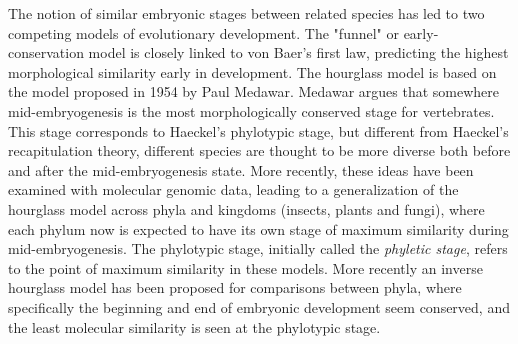 The notion of similar embryonic stages between related species has led to two competing models of evolutionary development. The "funnel" or early-conservation model is closely linked to von Baer's first law, predicting the highest morphological similarity early in development. The hourglass model is based on the model proposed in 1954 by Paul Medawar\cite{Medawar1954}. Medawar argues that somewhere mid-embryogenesis is the most morphologically conserved stage for vertebrates. This stage corresponds to Haeckel's phylotypic stage, but different from Haeckel's recapitulation theory, different species are thought to be more diverse both before and after the mid-embryogenesis state. More recently, these ideas have been examined with molecular genomic data, leading to a generalization of the hourglass model across phyla and kingdoms (insects\cite{Kalinka2010}, plants\cite{Quint2012} and fungi\cite{Cheng2015}), where each phylum now is expected to have its own stage of maximum similarity during mid-embryogenesis. The phylotypic stage, initially called the \textit{phyletic stage}, refers to the point of maximum similarity in these models\cite{Cohen1963, Seidel1960}. More recently an inverse hourglass model has been proposed for comparisons between phyla, where specifically the beginning and end of embryonic development seem conserved, and the least molecular similarity is seen at the phylotypic stage\cite{Levin2016}.

